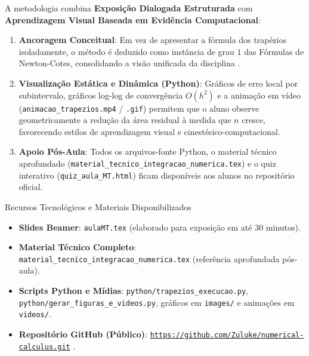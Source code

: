 \documentclass[11pt,a4paper]{article}
\begin{document}
A metodologia combina \textbf{Exposição Dialogada Estruturada} com \textbf{Aprendizagem Visual Baseada em Evidência Computacional}:
\begin{enumerate}[leftmargin=1.5em]
    \item \textbf{Ancoragem Conceitual}: Em vez de apresentar a fórmula dos trapézios isoladamente, o método é deduzido como instância de grau $1$ das Fórmulas de Newton-Cotes, consolidando a visão unificada da disciplina \cite{santos2010, claudio1994}.
    \item \textbf{Visualização Estática e Dinâmica (Python)}: Gráficos de erro local por subintervalo, gráficos log-log de convergência $O(h^2)$ e a animação em vídeo (\texttt{animacao\_trapezios.mp4} / \texttt{.gif}) permitem que o aluno observe geometricamente a redução da área residual à medida que $n$ cresce, favorecendo estilos de aprendizagem visual e cinestésico-computacional.
    \item \textbf{Apoio Pós-Aula}: Todos os arquivos-fonte Python, o material técnico aprofundado (\texttt{material\_tecnico\_integracao\_numerica.tex}) e o quiz interativo (\texttt{quiz\_aula\_MT.html}) ficam disponíveis aos alunos no repositório oficial.
\end{enumerate}

\begin{destaquecaixa}{Recursos Tecnológicos e Materiais Disponibilizados}
\begin{itemize}[leftmargin=1.3em]\small
    \item \textbf{Slides Beamer}: \texttt{aulaMT.tex} (elaborado para exposição em até 30 minutos).
    \item \textbf{Material Técnico Completo}: \texttt{material\_tecnico\_integracao\_numerica.tex} (referência aprofundada pós-aula).
    \item \textbf{Scripts Python e Mídias}: \texttt{python/trapezios\_execucao.py}, \texttt{python/gerar\_figuras\_e\_videos.py}, gráficos em \texttt{images/} e animações em \texttt{videos/}.
    \item \textbf{Repositório GitHub (Público)}: \href{https://github.com/Zuluke/numerical-calculus.git}{\nolinkurl{https://github.com/Zuluke/numerical-calculus.git}} \cite{cardoso2026_github}.
\end{itemize}
\end{destaquecaixa}

\end{document}
